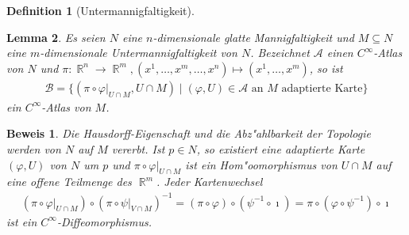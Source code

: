 \documentclass[paper=A4, twoside, chapterprefix=true, bibliography=totoc, headsepline]{scrbook}
\let\temp\phi{}
\let\phi\varphi{}
\let\varphi\temp{}
\let\temp\theta{}
\let\theta\vartheta{}
\let\vartheta\temp{}
\let\temp\epsilon{}
\let\epsilon\varepsilon{}
\let\varepsilon\temp{}
\let\temp\rho{}
\let\rho\varrho{}
\let\varrho\temp{}
\DeclareMathOperator{\R}{\mathbb{R}}
\theoremstyle{plain}
\newtheorem{Dfn}{Definition}[chapter]
\newtheorem{Lemma}[Dfn]{Lemma}
\theoremstyle{nonumberplain}
\newtheorem{bew}{Beweis}
\theoremstyle{empty}
\theoremstyle{break}
\begin{document}
\begin{Dfn}[Untermannigfaltigkeit]
\begin{center}
\end{center}

\end{Dfn}

\begin{Lemma}\label{lemma-1-5}
  Es seien $N$ eine $n$-dimensionale glatte Mannigfaltigkeit und $M \subseteq N$ eine $m$-dimensionale Untermannigfaltigkeit von $N$. Bezeichnet $\mathcal A$ einen $C^{\infty}$-Atlas von $N$ und $\pi \colon \R^n \to \R^m, (x^1, \ldots, x^m,\ldots,x^n) \mapsto (x^1, \ldots, x^m)$, so ist
  \begin{align*}
    \mathcal B = \{(\pi \circ \phi|_{U \cap M},U\cap M) \mid (\phi, U) \in \mathcal A \text{ an } M \text{ adaptierte Karte}\}
  \end{align*}
  ein $C^{\infty}$-Atlas von $M$.
\end{Lemma}

\begin{bew}
Die Hausdorff-Eigenschaft und die Abz"ahlbarkeit der Topologie werden von $N$ auf $M$ vererbt.
Ist $p \in N$, so existiert eine adaptierte Karte $(\phi,U)$ von $N$ um $p$ und $\pi \circ \phi|_{U \cap M}$ ist ein Hom"oomorphismus von $U \cap M$ auf eine offene Teilmenge des $\R^m$. Jeder Kartenwechsel
\begin{align*}
	(\pi \circ \phi|_{U \cap M}) \circ (\pi \circ \psi|_{V \cap M})^{-1} = (\pi \circ \phi) \circ (\psi^{-1} \circ \imath) = \pi \circ (\phi \circ \psi^{-1}) \circ \imath
\end{align*}
ist ein $C^{\infty}$-Diffeomorphismus.
\end{bew}
\end{document}
